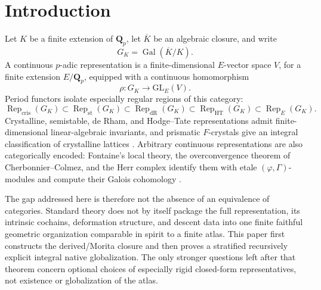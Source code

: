 \documentclass[11pt]{article}
\theoremstyle{definition}
\newcommand{\Qp}{\mathbf Q_p}
\newcommand{\GK}{G_K}
\newcommand{\Rep}{\operatorname{Rep}}
\newcommand{\Gal}{\operatorname{Gal}}
\newcommand{\cris}{\mathrm{cris}}
\newcommand{\st}{\mathrm{st}}
\newcommand{\dR}{\mathrm{dR}}
\begin{document}
\begin{abstract}
The resulting derived faithful finite closure is unconditional: for fixed local field, coefficient field, and rank, finitely many residual sectors carry canonical two-layer derived charts consisting of a Cayley--Hamilton full-transport carrier and a perfect coefficient-cochain carrier, with Morita-valued descent.  The residual, Fitting, flag, and descent-exponent constructions upgrade these charts to a stratified recursively explicit native atlas: finite-stage descent, native presentation transitions, and every prescribed coherence level reduce to finite matrix operations and terminating chartwise procedures.  Raw Herr comparison is multiplicative at the intrinsic level and its direct Tate-dual linear representative is canonically normalized modulo continuous phantom maps; literal equality on one unreduced Robba representative is only an optional strict gauge.  Wildness therefore limits normal forms, not finite native globalization.  Period and prismatic descriptions are used only as comparison charts and are not part of the foundational construction.
\end{abstract}

\tableofcontents

\section{Introduction}

Let $K$ be a finite extension of $\Qp$, let $\overline K$ be an algebraic closure, and write
\[
\GK=\Gal(\overline K/K).
\]
A continuous $p$-adic representation is a finite-dimensional $E$-vector space $V$, for a finite extension $E/\Qp$, equipped with a continuous homomorphism
\[
\rho:\GK\longrightarrow \mathrm{GL}_E(V).
\]
Period functors isolate especially regular regions of this category:
\[
\Rep_{\cris}(\GK)\subset \Rep_{\st}(\GK)\subset \Rep_{\dR}(\GK)
\subset \Rep_{\mathrm{HT}}(\GK)\subset \Rep_E(\GK).
\]
Crystalline, semistable, de Rham, and Hodge--Tate representations admit finite-dimensional linear-algebraic invariants, and prismatic $F$-crystals give an integral classification of crystalline lattices \cite{BhattScholzePFC}.  Arbitrary continuous representations are also categorically encoded: Fontaine's local theory, the overconvergence theorem of Cherbonnier--Colmez, and the Herr complex identify them with etale $(\varphi,\Gamma)$-modules and compute their Galois cohomology \cite{FontaineLocal,CherbonnierColmez,HerrSurvey,LiuCohomology,BergerTrianguline,ColmezTrianguline}.

The gap addressed here is therefore not the absence of an equivalence of categories.  Standard theory does not by itself package the full representation, its intrinsic cochains, deformation structure, and descent data into one finite faithful geometric organization comparable in spirit to a finite atlas.  This paper first constructs the derived/Morita closure and then proves a stratified recursively explicit integral native globalization.  The only stronger questions left after that theorem concern optional choices of especially rigid closed-form representatives, not existence or globalization of the atlas.
\end{document}
